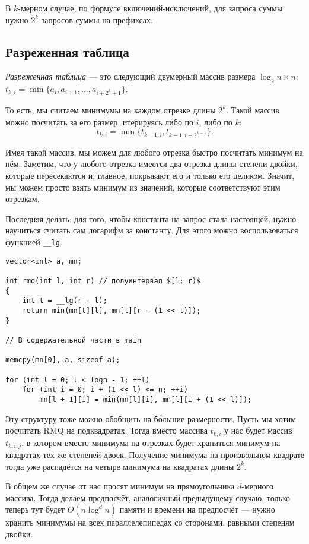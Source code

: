 В $k$-мерном случае, по формуле включений-исключений, для запроса суммы нужно $2^k$ запросов суммы на префиксах.

\subsection{Разреженная таблица}

\begin{definition}
    \textit{Разреженная таблица} --- это следующий двумерный массив размера $\log_2n \times n$: $t_{k, i} = \min\{a_i, a_{i + 1}, \ldots, a_{i + 2^k + 1}\}$.
\end{definition}

То есть, мы считаем минимумы на каждом отрезке длины $2^k$. Такой массив можно посчитать за его размер, итерируясь либо по $i$, либо по $k$:
\[
    t_{k, i} = \min\{t_{k - 1, i}, t_{k - 1, i + 2^{k - 1}}\}.
\]

Имея такой массив, мы можем для любого отрезка быстро посчитать минимум на нём. Заметим, что у любого отрезка имеется два отрезка длины степени двойки, которые пересекаются и, главное, покрывают его и только его целиком. Значит, мы можем просто взять минимум из значений, которые соответствуют этим отрезкам.

Последняя делать: для того, чтобы константа на запрос стала настоящей, нужно научиться считать сам логарифм за константу. Для этого можно воспользоваться функцией \texttt{\_\_lg}.

\begin{verbatim}
vector<int> a, mn;

int rmq(int l, int r) // полуинтервал $[l; r)$
{
    int t = __lg(r - l);
    return min(mn[t][l], mn[t][r - (1 << t)]);
}

// В содержательной части в main

memcpy(mn[0], a, sizeof a);

for (int l = 0; l < logn - 1; ++l)
    for (int i = 0; i + (1 << l) <= n; ++i)
        mn[l + 1][i] = min(mn[l][i], mn[l][i + (1 << l)]);
\end{verbatim}

Эту структуру тоже можно обобщить на б\'{о}льшие размерности. Пусть мы хотим посчитать RMQ на подквадратах. Тогда вместо массива $t_{k, i}$ у нас будет массив $t_{k, i, j}$, в котором вместо минимума на отрезках будет храниться минимум на квадратах тех же степеней двоек. Получение минимума на произвольном квадрате тогда уже распадётся на четыре минимума на квадратах длины $2^k$.

В общем же случае от нас просят минимум на прямоугольника $d$-мерного массива. Тогда делаем предпосчёт, аналогичный предыдущему случаю, только теперь тут будет $O(n\log^dn)$ памяти и времени на предпосчёт --- нужно хранить минимумы на всех параллелепипедах со сторонами, равными степеням двойки.

